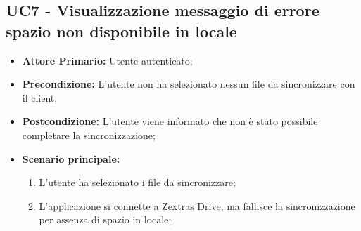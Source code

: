 \subsection{UC7 - Visualizzazione messaggio di errore spazio non disponibile in locale}
\label{UC7}
\begin{itemize}
\item \textbf{Attore Primario:} Utente autenticato;
\item \textbf{Precondizione:} L'utente non ha selezionato nessun file da sincronizzare con il client;
\item \textbf{Postcondizione:} L'utente viene informato che non è stato possibile completare la sincronizzazione;
\item \textbf{Scenario principale:}
    \begin{enumerate}
    \item L'utente ha selezionato i file da sincronizzare;
    \item L'applicazione si connette a Zextras Drive, ma fallisce la sincronizzazione per assenza di spazio in locale;
    \end{enumerate}
\end{itemize}
